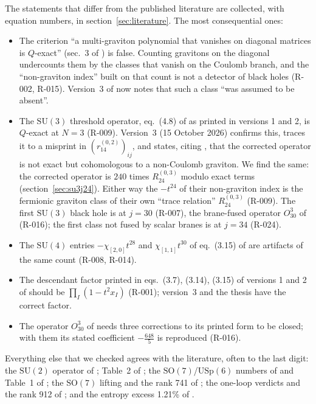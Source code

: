 \documentclass[11pt]{article}
\newcommand{\R}[1]{\textsf{R-0#1}}
\newcommand{\SU}{\mathrm{SU}}
\newcommand{\SO}{\mathrm{SO}}
\newcommand{\USp}{\mathrm{USp}}
\begin{document}
The statements that differ from the published literature are collected, with equation numbers, in
section~\ref{sec:literature}. The most consequential ones:
\begin{itemize}
\item The criterion ``a multi-graviton polynomial that vanishes on diagonal matrices is $Q$-exact'' (sec.~3 of
\cite{CCKLL}) is false. Counting gravitons on the diagonal undercounts them by the classes that vanish on the Coulomb
branch, and the ``non-graviton index'' built on that count is not a detector of black holes (\R{02}, \R{15}).
Version~3 of \cite{CCKLL} now notes that such a class ``was assumed to be absent''.
\item The $\SU(3)$ threshold operator, eq.~(4.8) of \cite{CCKLL} as printed in versions 1 and 2, is $Q$-exact at
$N=3$ (\R{09}). Version~3 (15 October 2026) confirms this, traces it to a misprint in $(r_{14}^{(0,2)})_{ij}$, and
states, citing \cite{KLLS}, that the corrected operator is not exact but cohomologous to a non-Coulomb graviton. We
find the same: the corrected operator is $240$ times $R_{24}^{(0,3)}$ modulo exact terms
(section~\ref{sec:su3j24}). Either way the $-t^{24}$ of their non-graviton index is the fermionic graviton class of
their own ``trace relation'' $R_{24}^{(0,3)}$ (\R{09}). The first $\SU(3)$ black hole is at $j=30$ (\R{07}), the brane-fused operator $O^3_{30}$ of \cite{dMK}
(\R{16}); the first class not fused by scalar branes is at $j=34$ (\R{24}).
\item The $\SU(4)$ entries $-\chi_{[2,0]}t^{28}$ and $\chi_{[1,1]}t^{30}$ of eq.~(3.15) of \cite{CCKLL} are artifacts of
the same count (\R{08}, \R{14}).
\item The descendant factor printed in eqs.~(3.7), (3.14), (3.15) of versions 1 and 2 of \cite{CCKLL} should be
$\prod_I(1-t^2x_I)$ (\R{01}); version~3 and the thesis \cite{LeeThesis} have the correct factor.
\item The operator $O^3_{30}$ of \cite{dMK} needs three corrections to its printed form to be closed; with them its
stated coefficient $-\tfrac{648}{5}$ is reproduced (\R{16}).
\end{itemize}
Everything else that we checked agrees with the literature, often to the last digit: the $\SU(2)$ operator of
\cite{CKLP}; Table~2 of \cite{CCKLL}; the $\SO(7)$/$\USp(6)$ numbers of \cite{GLRT} and Table~1 of \cite{CLSduality};
the $\SO(7)$ lifting and the rank 741 of \cite{ChoiLee}; the one-loop verdicts and the rank 912 of \cite{KKLP}; and the
entropy excess 1.21\% of \cite{KKLP}.
\end{document}
